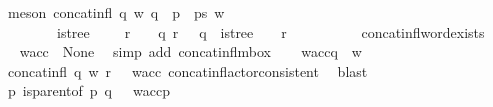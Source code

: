 \begin{isabellebody}
\ {\isacharparenleft}{\kern0pt}meson\ {\isacartoucheopen}concat{\isacharunderscore}{\kern0pt}infl\ q\ w\ {\isacharparenleft}{\kern0pt}q\ {\isacharhash}{\kern0pt}\ p\ {\isacharhash}{\kern0pt}\ ps{\isacharparenright}{\kern0pt}\ w{\isacartoucheclose}\isanewline
\ \ \ \ \ \ \ \ {\isacartoucheopen}is{\isacharunderscore}{\kern0pt}tree\ {\isacharparenleft}{\kern0pt}{\isasymP}{\isacharparenright}{\kern0pt}\ {\isacharparenleft}{\kern0pt}{\isasymG}{\isacharparenright}{\kern0pt}\ {\isasymand}\ {\isasymP}\isactrlsub {\isacharquery}{\kern0pt}\ r\ {\isacharequal}{\kern0pt}\ {\isacharbraceleft}{\kern0pt}{\isacharbraceright}{\kern0pt}\ {\isasymand}\ {\isacharparenleft}{\kern0pt}{\isasymforall}q{\isachardot}{\kern0pt}\ r\ {\isasymnotin}\ {\isasymP}\isactrlsub {\isacharbang}{\kern0pt}\ q{\isacharparenright}{\kern0pt}\ {\isasymor}\ is{\isacharunderscore}{\kern0pt}tree\ {\isacharparenleft}{\kern0pt}{\isasymP}{\isacharparenright}{\kern0pt}\ {\isacharparenleft}{\kern0pt}{\isasymG}{\isacharparenright}{\kern0pt}\ {\isasymand}\ {\isasymG}{\isasymlangle}{\isasymrightarrow}r{\isasymrangle}\ {\isacharequal}{\kern0pt}\ {\isacharbraceleft}{\kern0pt}{\isacharbraceright}{\kern0pt}{\isacartoucheclose}\isanewline
\ \ \ \ \ \ \ \ concat{\isacharunderscore}{\kern0pt}infl{\isacharunderscore}{\kern0pt}word{\isacharunderscore}{\kern0pt}exists{\isacharparenright}{\kern0pt}\isanewline
\ \ \isamarkupfalse%
\ \isamarkupfalse%
\ {\isachardoublequoteopen}w{\isacharunderscore}{\kern0pt}acc\ {\isasymin}\ {\isasymT}\isactrlbsub None\isactrlesub {\isachardoublequoteclose}\ \isamarkupfalse%
\ {\isacharparenleft}{\kern0pt}simp\ add{\isacharcolon}{\kern0pt}\ concat{\isacharunderscore}{\kern0pt}infl{\isacharunderscore}{\kern0pt}mbox{\isacharparenright}{\kern0pt}\isanewline
\ \ \isamarkupfalse%
\ {\isachardoublequoteopen}w{\isacharunderscore}{\kern0pt}acc{\isasymdown}\isactrlsub q\ {\isacharequal}{\kern0pt}\ w{\isachardoublequoteclose}\ \ \isamarkupfalse%
\ {\isacartoucheopen}concat{\isacharunderscore}{\kern0pt}infl\ q\ w\ {\isacharparenleft}{\kern0pt}r\ {\isacharhash}{\kern0pt}\ {\isasymepsilon}{\isacharparenright}{\kern0pt}\ w{\isacharunderscore}{\kern0pt}acc{\isacartoucheclose}\ concat{\isacharunderscore}{\kern0pt}infl{\isacharunderscore}{\kern0pt}actor{\isacharunderscore}{\kern0pt}consistent\ \isamarkupfalse%
\ blast\isanewline
\ \ \isamarkupfalse%
\ \isamarkupfalse%
\ {\isachardoublequoteopen}{\isacharparenleft}{\kern0pt}{\isasymforall}p{\isachardot}{\kern0pt}\ {\isacharparenleft}{\kern0pt}is{\isacharunderscore}{\kern0pt}parent{\isacharunderscore}{\kern0pt}of\ p\ q{\isacharparenright}{\kern0pt}\ {\isasymlongrightarrow}\ \ w{\isacharunderscore}{\kern0pt}acc{\isasymdown}\isactrlsub p\ {\isacharequal}{\kern0pt}\ {\isasymepsilon}{\isacharparenright}{\kern0pt}{\isachardoublequoteclose}\ \ \isamarkupfalse%

\end{isabellebody}
